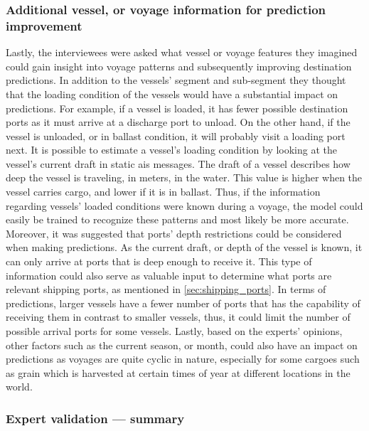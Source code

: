 \subsubsection{Additional vessel, or voyage information for prediction improvement}

Lastly, the interviewees were asked what vessel or voyage features they imagined could gain insight into voyage patterns and subsequently improving destination predictions. In addition to the vessels' segment and sub-segment they thought that the loading condition of the vessels would have a substantial impact on predictions. For example, if a vessel is loaded, it has fewer possible destination ports as it must arrive at a discharge port to unload. On the other hand, if the vessel is unloaded, or in ballast condition, it will probably visit a loading port next. It is possible to estimate a vessel's loading condition by looking at the vessel's current draft in static \acrshort{ais} messages. The draft of a vessel describes how deep the vessel is traveling, in meters, in the water. This value is higher when the vessel carries cargo, and lower if it is in ballast. Thus, if the information regarding vessels' loaded conditions were known during a voyage, the model could easily be trained to recognize these patterns and most likely be more accurate. Moreover, it was suggested that ports' depth restrictions could be considered when making predictions. As the current draft, or depth of the vessel is known, it can only arrive at ports that is deep enough to receive it. This type of information could also serve as valuable input to determine what ports are relevant shipping ports, as mentioned in \cref{sec:shipping_ports}. In terms of predictions, larger vessels have a fewer number of ports that has the capability of receiving them in contrast to smaller vessels, thus, it could limit the number of possible arrival ports for some vessels. Lastly, based on the experts' opinions, other factors such as the current season, or month, could also have an impact on predictions as voyages are quite cyclic in nature, especially for some cargoes such as grain which is harvested at certain times of year at different locations in the world.

\subsubsection{Expert validation --- summary}
